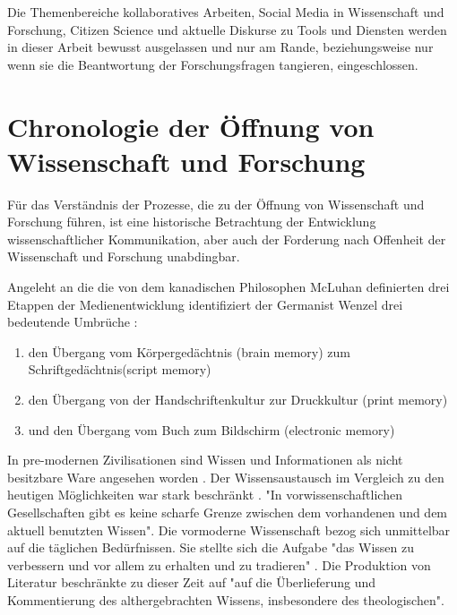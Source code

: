 Die Themenbereiche kollaboratives Arbeiten, Social Media in Wissenschaft und Forschung, Citizen Science und aktuelle Diskurse zu Tools und Diensten werden in dieser Arbeit bewusst ausgelassen und nur am Rande, beziehungsweise nur wenn sie die Beantwortung der Forschungsfragen tangieren, eingeschlossen.

\section{Chronologie der Öffnung von Wissenschaft und Forschung}
Für das Verständnis der Prozesse, die zu der Öffnung von Wissenschaft und Forschung führen, ist eine historische Betrachtung der Entwicklung wissenschaftlicher Kommunikation, aber auch der Forderung nach Offenheit der Wissenschaft und Forschung unabdingbar. 

Angeleht an die die von dem kanadischen Philosophen McLuhan definierten drei Etappen der Medienentwicklung \cite{wunderlich_2008_buchdruck} identifiziert der Germanist Wenzel drei bedeutende Umbrüche \cite{wenzel_mediengeschichte_2007}: 
\begin{enumerate}
\item den Übergang vom Körpergedächtnis (brain memory) zum Schriftgedächtnis(script memory)
\item den Übergang von der Handschriftenkultur zur Druckkultur (print memory)
\item und den Übergang vom Buch zum Bildschirm (electronic memory)
\end{enumerate}

In pre-modernen Zivilisationen sind Wissen und Informationen als nicht besitzbare Ware angesehen worden\cite{cite:18} \cite{steiner_1998_autorenhonorar}. Der Wissensaustausch im Vergleich zu den heutigen Möglichkeiten war stark beschränkt \cite{cite:17c}. "In vorwissenschaftlichen Gesellschaften gibt es keine scharfe Grenze zwischen dem vorhandenen und dem aktuell benutzten Wissen"\cite{Luhmann1998}. Die vormoderne Wissenschaft bezog sich unmittelbar auf die täglichen Bedürfnissen. Sie stellte sich die Aufgabe "das Wissen zu verbessern und vor allem zu erhalten und zu tradieren" \cite{Luhmann1998}. Die Produktion von Literatur beschränkte zu dieser Zeit auf "auf die Überlieferung und Kommentierung des althergebrachten Wissens, insbesondere des theologischen"\cite{steiner_1998_autorenhonorar}.

